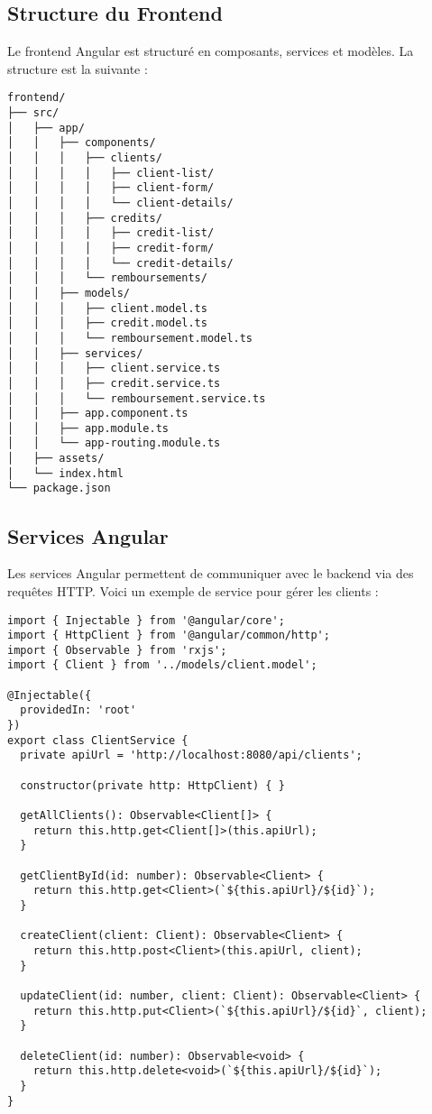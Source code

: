 \subsection{Structure du Frontend}
Le frontend Angular est structuré en composants, services et modèles. La structure est la suivante :

\begin{lstlisting}[caption=Structure du frontend Angular]
frontend/
├── src/
│   ├── app/
│   │   ├── components/
│   │   │   ├── clients/
│   │   │   │   ├── client-list/
│   │   │   │   ├── client-form/
│   │   │   │   └── client-details/
│   │   │   ├── credits/
│   │   │   │   ├── credit-list/
│   │   │   │   ├── credit-form/
│   │   │   │   └── credit-details/
│   │   │   └── remboursements/
│   │   ├── models/
│   │   │   ├── client.model.ts
│   │   │   ├── credit.model.ts
│   │   │   └── remboursement.model.ts
│   │   ├── services/
│   │   │   ├── client.service.ts
│   │   │   ├── credit.service.ts
│   │   │   └── remboursement.service.ts
│   │   ├── app.component.ts
│   │   ├── app.module.ts
│   │   └── app-routing.module.ts
│   ├── assets/
│   └── index.html
└── package.json
\end{lstlisting}

\subsection{Services Angular}
Les services Angular permettent de communiquer avec le backend via des requêtes HTTP. Voici un exemple de service pour gérer les clients :

\begin{lstlisting}[caption=Service Angular pour Client]
import { Injectable } from '@angular/core';
import { HttpClient } from '@angular/common/http';
import { Observable } from 'rxjs';
import { Client } from '../models/client.model';

@Injectable({
  providedIn: 'root'
})
export class ClientService {
  private apiUrl = 'http://localhost:8080/api/clients';

  constructor(private http: HttpClient) { }

  getAllClients(): Observable<Client[]> {
    return this.http.get<Client[]>(this.apiUrl);
  }

  getClientById(id: number): Observable<Client> {
    return this.http.get<Client>(`${this.apiUrl}/${id}`);
  }

  createClient(client: Client): Observable<Client> {
    return this.http.post<Client>(this.apiUrl, client);
  }

  updateClient(id: number, client: Client): Observable<Client> {
    return this.http.put<Client>(`${this.apiUrl}/${id}`, client);
  }

  deleteClient(id: number): Observable<void> {
    return this.http.delete<void>(`${this.apiUrl}/${id}`);
  }
}
\end{lstlisting}

